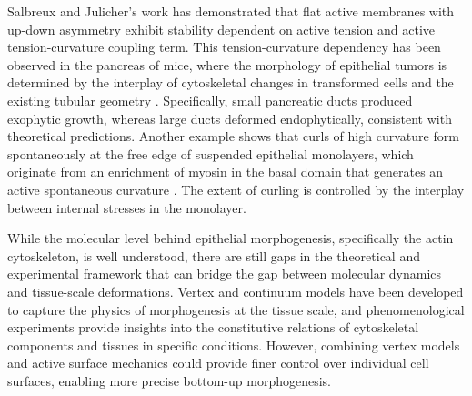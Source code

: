 Salbreux and Julicher's work has demonstrated that flat active membranes with up-down asymmetry exhibit stability dependent on active tension and active tension-curvature coupling term. This tension-curvature dependency has been observed in the pancreas of mice, where the morphology of epithelial tumors is determined by the interplay of cytoskeletal changes in transformed cells and the existing tubular geometry \cite{messal2019}. Specifically, small pancreatic ducts produced exophytic growth, whereas large ducts deformed endophytically, consistent with theoretical predictions. Another example shows that curls of high curvature form spontaneously at the free edge of suspended epithelial monolayers, which originate from an enrichment of myosin in the basal domain that generates an active spontaneous curvature \cite{fouchard2020}. The extent of curling is controlled by the interplay between internal stresses in the monolayer.

While the molecular level behind epithelial morphogenesis, specifically the actin cytoskeleton, is well understood, there are still gaps in the theoretical and experimental framework that can bridge the gap between molecular dynamics and tissue-scale deformations. Vertex and continuum models have been developed to capture the physics of morphogenesis at the tissue scale, and phenomenological experiments provide insights into the constitutive relations of cytoskeletal components and tissues in specific conditions. However, combining vertex models and active surface mechanics could provide finer control over individual cell surfaces, enabling more precise bottom-up morphogenesis.